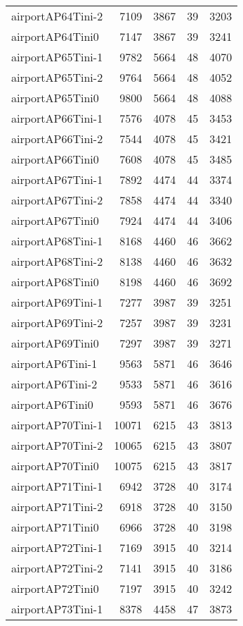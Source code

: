 \begin{longtable}{lrrrr}
airportAP64Tini-2 & 7109 & 3867 & 39 & 3203 \\
airportAP64Tini0 & 7147 & 3867 & 39 & 3241 \\
airportAP65Tini-1 & 9782 & 5664 & 48 & 4070 \\
airportAP65Tini-2 & 9764 & 5664 & 48 & 4052 \\
airportAP65Tini0 & 9800 & 5664 & 48 & 4088 \\
airportAP66Tini-1 & 7576 & 4078 & 45 & 3453 \\
airportAP66Tini-2 & 7544 & 4078 & 45 & 3421 \\
airportAP66Tini0 & 7608 & 4078 & 45 & 3485 \\
airportAP67Tini-1 & 7892 & 4474 & 44 & 3374 \\
airportAP67Tini-2 & 7858 & 4474 & 44 & 3340 \\
airportAP67Tini0 & 7924 & 4474 & 44 & 3406 \\
airportAP68Tini-1 & 8168 & 4460 & 46 & 3662 \\
airportAP68Tini-2 & 8138 & 4460 & 46 & 3632 \\
airportAP68Tini0 & 8198 & 4460 & 46 & 3692 \\
airportAP69Tini-1 & 7277 & 3987 & 39 & 3251 \\
airportAP69Tini-2 & 7257 & 3987 & 39 & 3231 \\
airportAP69Tini0 & 7297 & 3987 & 39 & 3271 \\
airportAP6Tini-1 & 9563 & 5871 & 46 & 3646 \\
airportAP6Tini-2 & 9533 & 5871 & 46 & 3616 \\
airportAP6Tini0 & 9593 & 5871 & 46 & 3676 \\
airportAP70Tini-1 & 10071 & 6215 & 43 & 3813 \\
airportAP70Tini-2 & 10065 & 6215 & 43 & 3807 \\
airportAP70Tini0 & 10075 & 6215 & 43 & 3817 \\
airportAP71Tini-1 & 6942 & 3728 & 40 & 3174 \\
airportAP71Tini-2 & 6918 & 3728 & 40 & 3150 \\
airportAP71Tini0 & 6966 & 3728 & 40 & 3198 \\
airportAP72Tini-1 & 7169 & 3915 & 40 & 3214 \\
airportAP72Tini-2 & 7141 & 3915 & 40 & 3186 \\
airportAP72Tini0 & 7197 & 3915 & 40 & 3242 \\
airportAP73Tini-1 & 8378 & 4458 & 47 & 3873 \\

\end{longtable}

